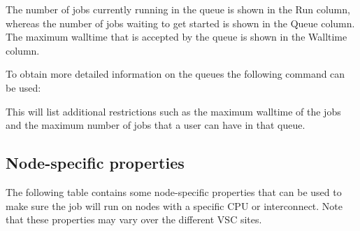 The number of jobs currently running in the queue is shown in the Run column,
whereas the number of jobs waiting to get started is shown in the Queue column.
The maximum walltime that is accepted by the queue is shown in the Walltime
column.

To obtain more detailed information on the queues the following command can be
used:

\begin{prompt}
\end{prompt}

This will list additional restrictions such as the maximum walltime of the jobs
and the maximum number of jobs that a user can have in that queue.
\fi

\subsection{Node-specific properties}

The following table contains some node-specific properties that can be used to
make sure the job will run on nodes with a specific CPU or interconnect. Note
that these properties may vary over the different VSC sites.

